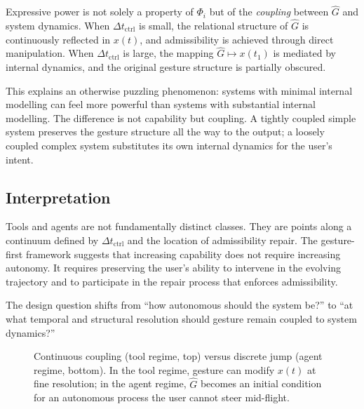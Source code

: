 \documentclass[11pt, a4paper]{article}
\begin{document}
Expressive power is not solely a property of $\Phi_i$ but of the
\emph{coupling} between $\hat{G}$ and system dynamics. When
$\Delta t_{\mathrm{ctrl}}$ is small, the relational structure of
$\hat{G}$ is continuously reflected in $x(t)$, and admissibility is
achieved through direct manipulation. When $\Delta t_{\mathrm{ctrl}}$ is
large, the mapping $\hat{G} \mapsto x(t_1)$ is mediated by internal
dynamics, and the original gesture structure is partially obscured.

This explains an otherwise puzzling phenomenon: systems with minimal
internal modelling can feel more powerful than systems with substantial
internal modelling. The difference is not capability but coupling. A
tightly coupled simple system preserves the gesture structure all the
way to the output; a loosely coupled complex system substitutes its own
internal dynamics for the user's intent.

\subsection{Interpretation}

Tools and agents are not fundamentally distinct classes. They are points
along a continuum defined by $\Delta t_{\mathrm{ctrl}}$ and the location
of admissibility repair. The gesture-first framework suggests that
increasing capability does not require increasing autonomy. It requires
preserving the user's ability to intervene in the evolving trajectory
and to participate in the repair process that enforces admissibility.

The design question shifts from ``how autonomous should the system be?''
to ``at what temporal and structural resolution should gesture remain
coupled to system dynamics?''

\begin{figure}[h]
\centering
{}
\caption{Continuous coupling (tool regime, top) versus discrete jump (agent
regime, bottom). In the tool regime, gesture can modify $x(t)$ at fine
resolution; in the agent regime, $\hat{G}$ becomes an initial condition
for an autonomous process the user cannot steer mid-flight.}
\label{fig:control}
\end{figure}
\end{document}
